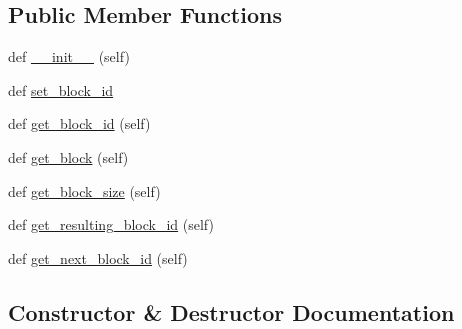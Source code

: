 \subsection*{Public Member Functions}
\begin{DoxyCompactItemize}
\item 
def \hyperlink{classNEAT__PyGenetics_1_1NEAT_1_1Networking_1_1Commands_1_1GetBlockCommand_1_1GetBlockCommand_ad58e15de61d1576383f64ad5e99ab691}{\+\_\+\+\_\+init\+\_\+\+\_\+} (self)
\item 
def \hyperlink{classNEAT__PyGenetics_1_1NEAT_1_1Networking_1_1Commands_1_1GetBlockCommand_1_1GetBlockCommand_abd6d6e34fe53e47b6bd8fe3be8a38f6c}{set\+\_\+block\+\_\+id}
\item 
def \hyperlink{classNEAT__PyGenetics_1_1NEAT_1_1Networking_1_1Commands_1_1GetBlockCommand_1_1GetBlockCommand_af58224cb2bfb479548d3ec42cdee8931}{get\+\_\+block\+\_\+id} (self)
\item 
def \hyperlink{classNEAT__PyGenetics_1_1NEAT_1_1Networking_1_1Commands_1_1GetBlockCommand_1_1GetBlockCommand_a0a4947f054e52700ca72c6f9f6ece118}{get\+\_\+block} (self)
\item 
def \hyperlink{classNEAT__PyGenetics_1_1NEAT_1_1Networking_1_1Commands_1_1GetBlockCommand_1_1GetBlockCommand_a54eae8fc81e0a71fec523ce013637fc0}{get\+\_\+block\+\_\+size} (self)
\item 
def \hyperlink{classNEAT__PyGenetics_1_1NEAT_1_1Networking_1_1Commands_1_1GetBlockCommand_1_1GetBlockCommand_aabe6091c8da0ef7cc5655cbcd1b7ec5b}{get\+\_\+resulting\+\_\+block\+\_\+id} (self)
\item 
def \hyperlink{classNEAT__PyGenetics_1_1NEAT_1_1Networking_1_1Commands_1_1GetBlockCommand_1_1GetBlockCommand_a97eb16c91c2ebb7081518119585f55fe}{get\+\_\+next\+\_\+block\+\_\+id} (self)
\end{DoxyCompactItemize}


\subsection{Constructor \& Destructor Documentation}
